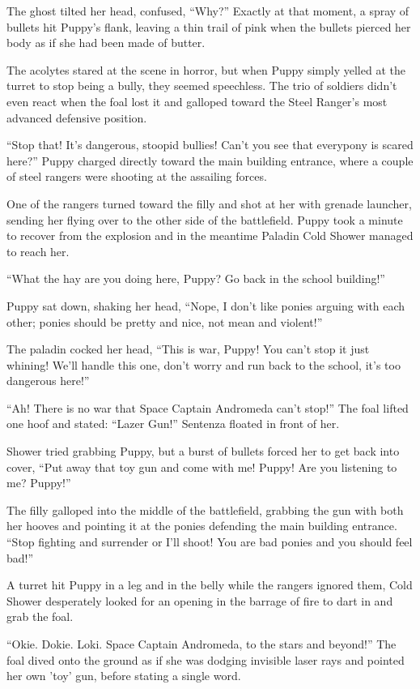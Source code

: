 The ghost tilted her head, confused, ``Why?'' Exactly at that moment, a spray of bullets hit Puppy's flank, leaving a thin trail of pink when the bullets pierced her body as if she had been made of butter.

The acolytes stared at the scene in horror, but when Puppy simply yelled at the turret to stop being a bully, they seemed speechless. The trio of soldiers didn't even react when the foal lost it and galloped toward the Steel Ranger's most advanced defensive position.

``Stop that! It's dangerous, stoopid bullies! Can't you see that everypony is scared here?'' Puppy charged directly toward the main building entrance, where a couple of steel rangers were shooting at the assailing forces.

One of the rangers turned toward the filly and shot at her with grenade launcher, sending her flying over to the other side of the battlefield. Puppy took a minute to recover from the explosion and in the meantime Paladin Cold Shower managed to reach her.

``What the hay are you doing here, Puppy? Go back in the school building!''

Puppy sat down, shaking her head, ``Nope, I don't like ponies arguing with each other; ponies should be pretty and nice, not mean and violent!''

The paladin cocked her head, ``This is war, Puppy! You can't stop it just whining! We'll handle this one, don't worry and run back to the school, it's too dangerous here!''

``Ah! There is no war that Space Captain Andromeda can't stop!'' The foal lifted one hoof and stated: ``Lazer Gun!'' Sentenza floated in front of her.

Shower tried grabbing Puppy, but a burst of bullets forced her to get back into cover, ``Put away that toy gun and come with me! Puppy! Are you listening to me? Puppy!''

The filly galloped into the middle of the battlefield, grabbing the gun with both her hooves and pointing it at the ponies defending the main building entrance. ``Stop fighting and surrender or I'll shoot! You are bad ponies and you should feel bad!''

A turret hit Puppy in a leg and in the belly while the rangers ignored them, Cold Shower desperately looked for an opening in the barrage of fire to dart in and grab the foal.

``Okie. Dokie. Loki. Space Captain Andromeda, to the stars and beyond!'' The foal dived onto the ground as if she was dodging invisible laser rays and pointed her own 'toy' gun, before stating a single word.


